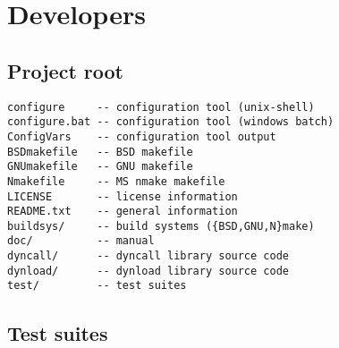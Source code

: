 \newpage
\section{Developers}

\subsection{Project root}
\begin{verbatim}
configure     -- configuration tool (unix-shell)
configure.bat -- configuration tool (windows batch)
ConfigVars    -- configuration tool output
BSDmakefile   -- BSD makefile
GNUmakefile   -- GNU makefile
Nmakefile     -- MS nmake makefile
LICENSE       -- license information
README.txt    -- general information
buildsys/     -- build systems ({BSD,GNU,N}make)
doc/          -- manual
dyncall/      -- dyncall library source code
dynload/      -- dynload library source code
test/         -- test suites
\end{verbatim}

\subsection{Test suites}


